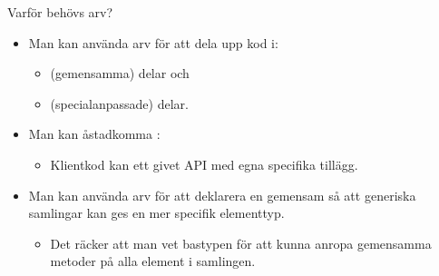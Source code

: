 \begin{Slide}{Varför behövs arv?}
\begin{itemize}
\item Man kan använda arv för att dela upp kod i:
\begin{itemize}
\item {} (gemensamma) delar och
\item {} (specialanpassade) delar.
\end{itemize}

\item Man kan åstadkomma :
\begin{itemize}
\item Klientkod kan   ett givet API med egna specifika tillägg.
\end{itemize}

\item Man kan använda arv för att deklarera en gemensam  så att generiska samlingar kan ges en mer specifik elementtyp.
\begin{itemize}
\item Det räcker att man vet bastypen för att kunna anropa gemensamma metoder på alla element i samlingen.
\end{itemize}
\end{itemize}
\end{Slide}



